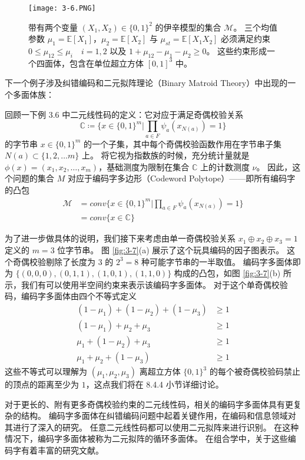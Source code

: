\begin{figure}[htbp]
    \centering
    \texttt{[image: 3-6.PNG]}
    \caption{
        带有两个变量 $(X_1, X_2) \in \{0, 1\}^2$ 的伊辛模型的集合 $\mathcal{M}$。
        三个均值参数 $\mu_1 = \mathbb{E}[X_1]$，$\mu_2 = \mathbb{E}[X_2]$ 与 $\mu_{st} = \mathbb{E}[X_1X_2]$ 必须满足约束 $0 \leq \mu_{12} \leq \mu_i \quad i = 1, 2$ 以及 $1 + \mu_{12} - \mu_1 - \mu_2 \geq 0$。
        这些约束形成一个四面体，包含在单位超立方体 $[0, 1]^3$ 中。
    }\label{fig:3-6}
\end{figure}

下一个例子涉及纠错编码和二元拟阵理论（Binary Matroid Theory）中出现的一个多面体族：

\begin{tcolorbox}
\begin{exam}[编码字多面体与二元拟阵]

回顾一下例 3.6 中二元线性码的定义：它对应于满足奇偶校验关系
$$\mathbb{C} \coloneqq \{x \in \{0, 1\}^m| \prod_{a \in F}\psi_a(x_{N(a)}) = 1\}$$
的字节串 $x \in \{0, 1\}^m$ 的一个子集，其中每个奇偶校验函数作用在字节串子集 $N(a) \subset \{1, 2, \dots m\}$ 上。
将它视为指数族的时候，充分统计量就是 $\phi(x) = (x_1, x_2, \dots, x_m)$，基础测度为限制在集合 $\mathbb{C}$ 上的计数测度 $\nu$。
因此，这个问题的集合 $M$ 对应于编码字多边形（Codeword Polytope）——即所有编码字的凸包
\begin{align}
    \mathcal{M} &= conv\{x \in \{0, 1\}^m| \prod_{a \in F}\psi_a(x_{N(a)}) = 1\} \nonumber \\
    &= conv\{x \in \mathbb{C}\}
\end{align}

为了进一步做具体的说明，我们接下来考虑由单一奇偶校验关系 $x_1 \oplus x_2 \oplus x_3 = 1$ 定义的 $m = 3$ 位字节串。
图 \ref{fig:3-7}(a) 展示了这个玩具编码的因子图表示。
这个奇偶校验剔除了长度为 $3$ 的 $2^3 = 8$ 种可能字节串的一半取值。
编码字多面体即为 $\{(0, 0, 0), (0, 1, 1), (1, 0, 1), (1, 1, 0)\}$ 构成的凸包，如图 \ref{fig:3-7}(b) 所示，我们有可以使用半空间约束来表示该编码字多面体。
对于这个单奇偶校验码，编码字多面体由四个不等式定义
\begin{subequations}
\begin{align}
    (1-\mu_1) + (1-\mu_2) + (1-\mu_3) &\geq 1 \\
    (1-\mu_1) + \mu_2 + \mu_3 &\geq 1 \\
    \mu_1 + (1-\mu_2) + \mu_3 &\geq 1 \\
    \mu_1 + \mu_2 + (1-\mu_3) &\geq 1
\end{align}
\end{subequations}
这些不等式可以理解为 $(\mu_1, \mu_2, \mu_3)$ 离超立方体 $\{0, 1\}^3$ 的每个被奇偶校验码禁止的顶点的距离至少为 $1$，这点我们将在 8.4.4 小节详细讨论。

对于更长的、附有更多奇偶校验约束的二元线性码，相关的编码字多面体具有更复杂的结构。
编码字多面体在纠错编码问题中起着关键作用，在编码和信息领域对其进行了深入的研究。
任意二元线性码都可以使用二元拟阵来进行识别。
在这种情况下，编码字多面体被称为二元拟阵的循环多面体。
在组合学中，关于这些编码字有着丰富的研究文献。

\end{exam}
\end{tcolorbox}

